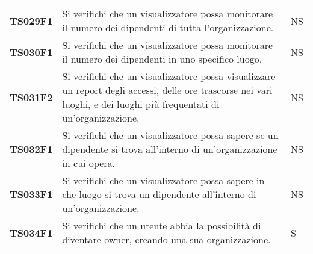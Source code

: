 \documentclass[../../piano-di-qualifica.tex]{subfiles}
\begin{document}
\begin{longtable}[H]{>{\centering\bfseries}m{3cm} >{}m{10cm} >{\centering\arraybackslash}m{3cm}}
  TS029F1            & Si verifichi che un visualizzatore possa monitorare il numero dei dipendenti di tutta l'organizzazione.
                     & NS                                                                                                                                                                                                                                                  \\

  TS030F1            & Si verifichi che un visualizzatore possa monitorare il numero dei dipendenti in uno specifico luogo.
                     & NS                                                                                                                                                                                                                                                  \\

  TS031F2            & Si verifichi che un visualizzatore possa visualizzare un report degli accessi, delle ore trascorse nei vari luoghi, e dei luoghi più frequentati di un'organizzazione.
                     & NS                                                                                                                                                                                                                                                  \\

  TS032F1            & Si verifichi che un visualizzatore possa sapere se un dipendente si trova all'interno di un'organizzazione in cui opera.
                     & NS                                                                                                                                                                                                                                                  \\

  TS033F1            & Si verifichi che un visualizzatore possa sapere in che luogo si trova un dipendente all'interno di un'organizzazione.
                     & NS                                                                                                                                                                                                                                                  \\

  TS034F1            & Si verifichi che un utente abbia la possibilità di diventare owner, creando una sua organizzazione.
                     & S                                                                                                                                                                                                                                                   \\


\end{longtable}
\end{document}
